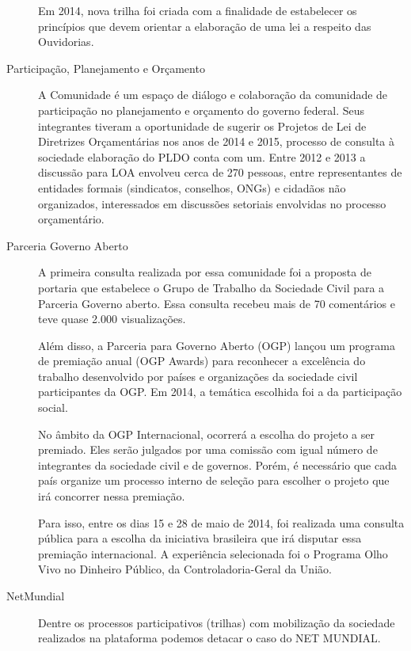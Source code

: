 \documentclass{article}
\begin{document}
\begin{description}
  Em 2014, nova trilha foi criada com a finalidade de estabelecer os princípios
  que devem orientar a elaboração de uma lei a respeito das Ouvidorias.

  \item [Participação, Planejamento e Orçamento]

  A Comunidade é um espaço de diálogo e colaboração da comunidade de
  participação no planejamento e orçamento do governo federal. Seus integrantes
  tiveram a oportunidade de sugerir os Projetos de Lei de Diretrizes
  Orçamentárias nos anos de 2014 e 2015, processo de consulta à sociedade
  elaboração do PLDO conta com um. 
Entre 2012 e 2013 a discussão para LOA envolveu cerca de 270 pessoas, entre representantes de entidades formais (sindicatos, conselhos, ONGs) e cidadãos não organizados, interessados em discussões setoriais envolvidas no processo orçamentário.

  \item [Parceria Governo Aberto]

  A primeira consulta realizada por essa comunidade foi a proposta de portaria
  que estabelece o Grupo de Trabalho da Sociedade Civil para a Parceria Governo
  aberto. Essa consulta recebeu mais de 70 comentários e teve quase 2.000
  visualizações.

  Além disso, a Parceria para Governo Aberto (OGP) lançou um programa de
  premiação anual (OGP Awards) para reconhecer a excelência do trabalho
  desenvolvido por países e organizações da sociedade civil participantes da
  OGP. Em 2014, a temática escolhida foi a da participação social.

  No âmbito da OGP Internacional, ocorrerá a escolha do projeto a ser premiado.
  Eles serão julgados por uma comissão com igual número de integrantes da
  sociedade civil e de governos. Porém, é necessário que cada país organize um
  processo interno de seleção para escolher o projeto que irá concorrer nessa
  premiação.

  Para isso, entre os dias 15 e 28 de maio de 2014, foi realizada uma consulta
  pública para a escolha da iniciativa brasileira que irá disputar essa
  premiação internacional. A experiência selecionada foi o Programa Olho Vivo
  no Dinheiro Público, da Controladoria-Geral da União.

  \item [NetMundial]

  Dentre os processos participativos (trilhas) com mobilização da sociedade
  realizados na plataforma podemos detacar o caso do NET MUNDIAL. 


\end{description}
\end{document}
